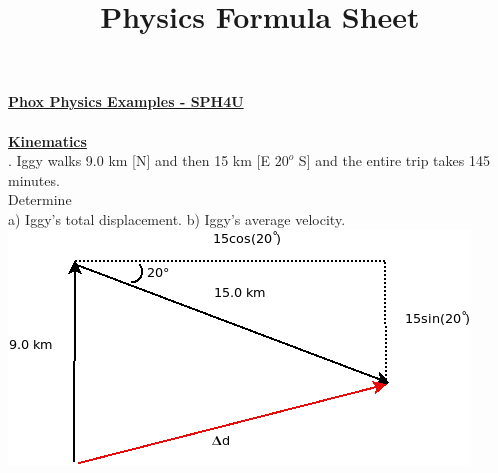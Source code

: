 \documentclass[10pt]{article}
\title{Physics Formula Sheet}
\begin{document}
\textbf{\underline{Phox Physics Examples - SPH4U}}\\
\\
\textbf{\underline{Kinematics}} \\
. Iggy walks 9.0 km [N] and then 15 km [E $20^o$ S] and the entire trip takes 145 minutes.\\
Determine \\

a) Iggy's total displacement. 
b) Iggy's average velocity. \\

\medskip
\includegraphics[scale=1]{Kinematics - 2D Displacement.png} \\
\end{document}
